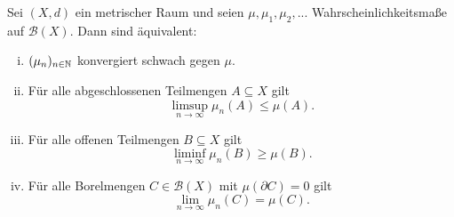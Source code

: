 
\begin{theorem}
    Sei $(X,d)$ ein metrischer Raum und seien $\mu, \mu_1, \mu_2,...$ Wahrscheinlichkeitsmaße auf $\mathcal{B}(X)$. Dann sind äquivalent:
    \begin{enumerate}[(i)]
        \item $(\mu_n)_{n \in \mathbb{N}}$ konvergiert schwach gegen $\mu$.
        \item Für alle abgeschlossenen Teilmengen $A \subseteq X$ gilt 
        $$
            \limsup_{n \to \infty} \mu_n(A) \leq \mu(A).
        $$
        \item Für alle offenen Teilmengen $B \subseteq X$ gilt 
        $$
            \liminf_{n \to \infty} \mu_n(B) \geq \mu(B).
        $$
        \item Für alle Borelmengen $C \in \mathcal{B}(X)$ mit $\mu(\partial C) = 0$ gilt 
        $$
            \lim_{n \to \infty}\mu_n(C) = \mu(C).
        $$
    \end{enumerate}
\end{theorem}


